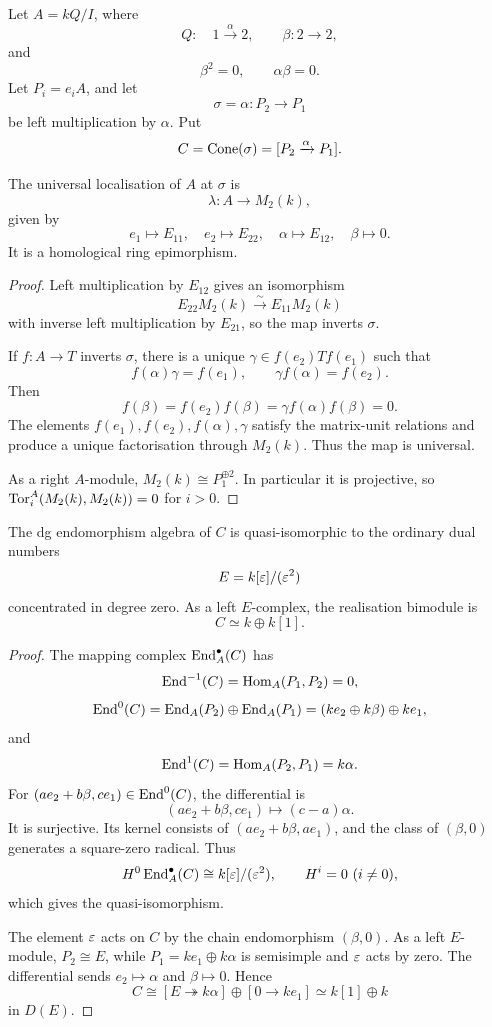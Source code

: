 Let \(A=kQ/I\), where
\[
 Q:\quad 1\xrightarrow{\alpha}2,
 \qquad \beta:2\to2,
\]
and
\[
 \beta^2=0,
 \qquad
 \alpha\beta=0.
\]
Let \(P_i=e_iA\), and let
\[
 \sigma=\alpha:P_2\longrightarrow P_1
\]
be left multiplication by \(\alpha\).  Put
\[
 C=\operatorname{Cone}(\sigma)=[P_2\xrightarrow{\alpha}P_1].
\]

\begin{proposition}\label{prop:dual-localisation}
The universal localisation of \(A\) at \(\sigma\) is
\[
 \lambda:A\longrightarrow M_2(k),
\]
given by
\[
 e_1\mapsto E_{11},\quad
 e_2\mapsto E_{22},\quad
 \alpha\mapsto E_{12},\quad
 \beta\mapsto0.
\]
It is a homological ring epimorphism.
\end{proposition}

\begin{proof}
Left multiplication by \(E_{12}\) gives an isomorphism
\[
 E_{22}M_2(k)\xrightarrow{\sim}E_{11}M_2(k)
\]
with inverse left multiplication by \(E_{21}\), so the map inverts \(\sigma\).

If \(f:A\to T\) inverts \(\sigma\), there is a unique
\(\gamma\in f(e_2)Tf(e_1)\) such that
\[
 f(\alpha)\gamma=f(e_1),
 \qquad
 \gamma f(\alpha)=f(e_2).
\]
Then
\[
 f(\beta)=f(e_2)f(\beta)
 =\gamma f(\alpha)f(\beta)=0.
\]
The elements \(f(e_1),f(e_2),f(\alpha),\gamma\) satisfy the matrix-unit relations and produce a unique factorisation through \(M_2(k)\).  Thus the map is universal.

As a right \(A\)-module, \(M_2(k)\cong P_1^{\oplus2}\).  In particular it is projective, so
\(\operatorname{Tor}_i^A(M_2(k),M_2(k))=0\) for \(i>0\).
\end{proof}

\begin{proposition}\label{prop:dual-dga}
The dg endomorphism algebra of \(C\) is quasi-isomorphic to the ordinary dual numbers
\[
 E=k[\varepsilon]/(\varepsilon^2)
\]
concentrated in degree zero.  As a left \(E\)-complex, the realisation bimodule is
\[
 C\simeq k\oplus k[1].
\]
\end{proposition}

\begin{proof}
The mapping complex \(\operatorname{End}_A^\bullet(C)\) has
\[
 \operatorname{End}^{-1}(C)=\operatorname{Hom}_A(P_1,P_2)=0,
\]
\[
 \operatorname{End}^0(C)=
 \operatorname{End}_A(P_2)\oplus\operatorname{End}_A(P_1)
 =(ke_2\oplus k\beta)\oplus ke_1,
\]
and
\[
 \operatorname{End}^1(C)=\operatorname{Hom}_A(P_2,P_1)=k\alpha.
\]
For \((ae_2+b\beta,ce_1)\in\operatorname{End}^0(C)\), the differential is
\[
 (ae_2+b\beta,ce_1)\longmapsto(c-a)\alpha.
\]
It is surjective.  Its kernel consists of
\((ae_2+b\beta,ae_1)\), and the class of \((\beta,0)\) generates a square-zero radical.  Thus
\[
 H^0\operatorname{End}_A^\bullet(C)\cong k[\varepsilon]/(\varepsilon^2),
 \qquad H^i=0\ (i\ne0),
\]
which gives the quasi-isomorphism.

The element \(\varepsilon\) acts on \(C\) by the chain endomorphism
\((\beta,0)\).  As a left \(E\)-module, \(P_2\cong E\), while
\(P_1=ke_1\oplus k\alpha\) is semisimple and \(\varepsilon\) acts by zero.  The differential sends \(e_2\mapsto\alpha\) and \(\beta\mapsto0\).  Hence
\[
 C\cong[E\twoheadrightarrow k\alpha]\oplus[0\to ke_1]
 \simeq k[1]\oplus k
\]
in \(D(E)\).
\end{proof}

